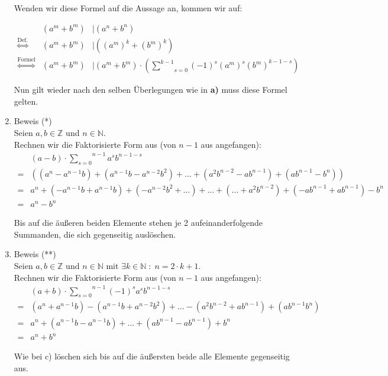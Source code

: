 \documentclass[11pt,a4paper,ngerman]{article}
\newcommand{\N}{\mathbb{N}}
\newcommand{\Z}{\mathbb{Z}}
\begin{document}
\begin{enumerate}[\bfseries a)]
Wenden wir diese Formel auf die Aussage an, kommen wir auf:

$$
\begin{array}{crl}

& \left( a^m + b^m \right) &| \left( a^n + b^n \right)\\
\stackrel{\text{Def.}}{\Leftrightarrow}& \left( a^m + b^m \right) &| \left( \left( a^m \right)^k + \left( b^m\right)^k \right)\\
\stackrel{\text{Formel}}{\Leftrightarrow} & \left( a^m + b^m \right) &| \left( a^m + b^m \right)\cdot \left( \underset{s=0}{\overset{k-1}{\sum}} (-1)^s \left( a^m \right)^s \left( b^m \right)^{k-1-s} \right)
\end{array}
$$

Nun gilt wieder nach den selben Überlegungen wie in \textbf{a)} muss diese Formel gelten.

\item Beweis (*)\\

Seien $a,b \in \Z$ und $n \in \N$.\\
Rechnen wir die Faktorisierte Form aus (von $n-1$ aus angefangen):
$$
\begin{array}{cl}
& \left( a - b\right) \cdot \overset{n-1}{\underset{s=0}{\sum}} a^s b^{n-1-s} \\
=& \left( \left( a^n - a^{n-1}b \right) + \left( a^{n-1} b - a^{n-2}b^2 \right) + ... + \left( a^2b^{n-2} - ab^{n-1} \right) + \left(ab^{n-1} - b^n \right) \right)\\
=&  a^n + \left( - a^{n-1}b +  a^{n-1} b \right)  + \left( - a^{n-2}b^2  + ... \right) +  ...+ \left( ...+   a^2b^{n-2}\right) + \left(  - ab^{n-1}  + ab^{n-1}\right) - b^n\\
=& a^n - b^n
\end{array}
$$

Bis auf die äußeren beiden Elemente stehen je 2 aufeinanderfolgende Summanden, die sich gegenseitig auslöschen.

\item Beweis (**)\\

Seien $a,b \in \Z$ und $n \in \N$ mit $\exists k \in \N \; : \; n = 2\cdot k + 1$.\\
Rechnen wir die Faktorisierte Form aus (von $n-1$ aus angefangen):
$$
\begin{array}{cl}
& \left( a + b \right) \cdot \overset{n-1}{\underset{s=0}{\sum}} (-1)^s a^s b^{n-1-s}\\
=& \left( a^n + a^{n-1}b \right) - \left( a^{n-1}b + a^{n-2}b^2 \right) + ... - \left(a^2b^{n-2} + ab^{n-1} \right) + \left( ab^{n-1} b^n\right)\\
=& a^n + \left( a^{n-1}b - a^{n-1}b \right) + ... + \left(ab^{n-1} - ab^{n-1} \right) + b^n\\
=& a^n + b^n
\end{array}
$$

Wie bei c) löschen sich bis auf die äußersten beide alle Elemente gegenseitig aus.

\end{enumerate}
\end{document}
